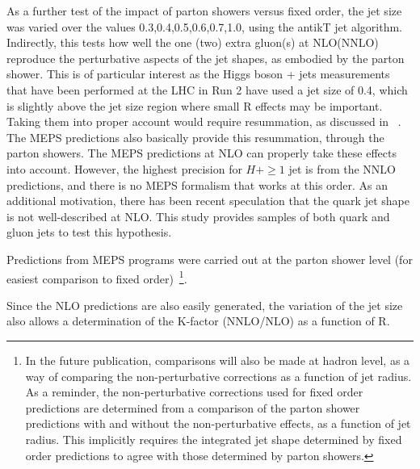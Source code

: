 \documentclass[aps,prd,onecolumn,fleqn,superscriptaddress,groupedaddress,nofootinbib,preprintnumbers,nobalancelastpage]{revtex4}
\begin{document}
As a  further test of the impact of parton showers versus fixed order, the jet
size was varied over the values 0.3,0.4,0.5,0.6,0.7,1.0, using the antikT jet
algorithm. Indirectly, this tests how well the one (two) extra gluon(s) at
NLO(NNLO) reproduce the perturbative aspects of the jet shapes, as embodied by
the parton shower. This is of particular interest as the Higgs boson + jets measurements that have been performed at the LHC in Run 2 have used a jet size of 0.4, which is 
slightly above the jet size region where small R effects may be important. Taking them into proper account would require resummation, as discussed in ~\cite{}. The MEPS predictions also basically provide this resummation, through the parton showers. The 
MEPS predictions at NLO can properly take these effects into account. However, the highest precision for $H+\ge1$ jet is from the NNLO predictions, and there is no MEPS formalism that works at this order.   As an additional motivation, there has been recent speculation that the quark jet shape is
not well-described at NLO. This study provides samples of both quark and gluon
jets to test this hypothesis.

  Predictions from MEPS programs were carried out
at the parton shower level (for easiest comparison to fixed order)~\footnote{In
the future publication, comparisons will also be made at hadron level, as a way
of comparing the non-perturbative corrections as a function of jet radius.  As a
reminder, the non-perturbative corrections used for fixed order predictions are
determined from a comparison of the parton shower predictions with and without
the non-perturbative effects, as a function of jet radius. This implicitly
requires the integrated jet shape determined by fixed order predictions to agree
with those determined by parton showers.}.

Since the NLO predictions are also easily generated, the variation of the jet
size also allows a determination of the K-factor (NNLO/NLO) as a function of R. 
\end{document}
